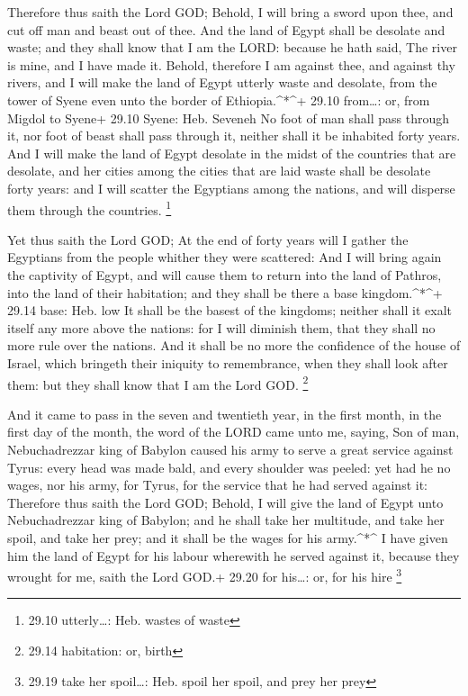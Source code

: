  Therefore thus saith the Lord GOD; Behold, I will bring a
sword upon thee, and cut off man and beast out of thee.  And
the land of Egypt shall be desolate and waste; and they shall know that
I am the LORD: because he hath said, The river is mine, and I have made
it.  Behold, therefore I am against thee, and against thy
rivers, and I will make the land of Egypt utterly waste and desolate,
from the tower of Syene even unto the border of Ethiopia.\^{}*\^{}+
29.10 from\ldots: or, from Migdol to Syene+ 29.10 Syene: Heb. Seveneh
 No foot of man shall pass through it, nor foot of beast
shall pass through it, neither shall it be inhabited forty years.
 And I will make the land of Egypt desolate in the midst of
the countries that are desolate, and her cities among the cities that
are laid waste shall be desolate forty years: and I will scatter the
Egyptians among the nations, and will disperse them through the
countries. \footnote{29.10 utterly\ldots: Heb. wastes of waste}

 Yet thus saith the Lord GOD; At the end of forty years
will I gather the Egyptians from the people whither they were scattered:
 And I will bring again the captivity of Egypt, and will
cause them to return into the land of Pathros, into the land of their
habitation; and they shall be there a base kingdom.\^{}*\^{}+ 29.14
base: Heb. low  It shall be the basest of the kingdoms;
neither shall it exalt itself any more above the nations: for I will
diminish them, that they shall no more rule over the nations.
 And it shall be no more the confidence of the house of
Israel, which bringeth their iniquity to remembrance, when they shall
look after them: but they shall know that I am the Lord GOD. \footnote{29.14
  habitation: or, birth}

 And it came to pass in the seven and twentieth year, in
the first month, in the first day of the month, the word of the LORD
came unto me, saying,  Son of man, Nebuchadrezzar king of
Babylon caused his army to serve a great service against Tyrus: every
head was made bald, and every shoulder was peeled: yet had he no wages,
nor his army, for Tyrus, for the service that he had served against it:
 Therefore thus saith the Lord GOD; Behold, I will give the
land of Egypt unto Nebuchadrezzar king of Babylon; and he shall take her
multitude, and take her spoil, and take her prey; and it shall be the
wages for his army.\^{}*\^{}  I have given him the land of
Egypt for his labour wherewith he served against it, because they
wrought for me, saith the Lord GOD.+ 29.20 for his\ldots: or, for his
hire \footnote{29.19 take her spoil\ldots: Heb. spoil her spoil, and
  prey her prey}

